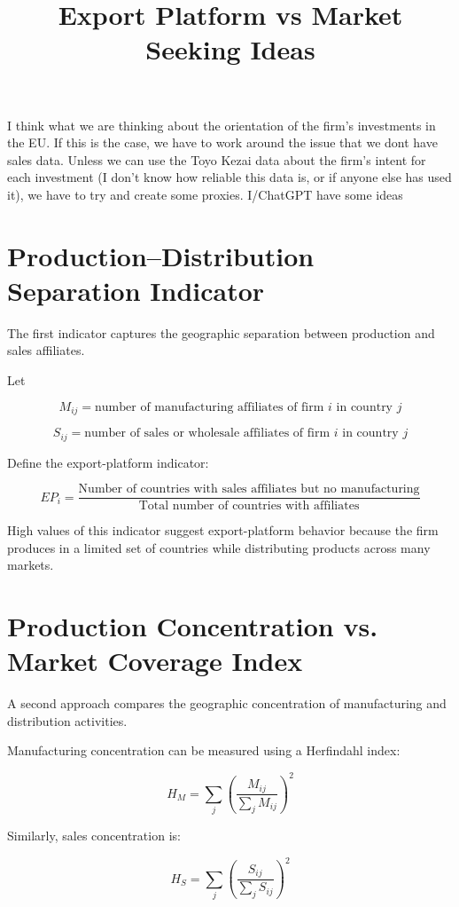 \documentclass[11pt]{article}
\title{Export Platform vs Market Seeking Ideas}
\date{}
\begin{document}
\maketitle

I think what we are thinking about the orientation of the firm's investments in the EU.  If this is the case, we have to work around the issue that we dont have sales data. Unless we can use the Toyo Kezai data about the firm's intent for each investment (I don't know how reliable this data is, or if anyone else has used it), we have to try and create some proxies.  I/ChatGPT have some ideas

\section{Production--Distribution Separation Indicator}

The first indicator captures the geographic separation between production and sales affiliates.

Let

\[
M_{ij} = \text{number of manufacturing affiliates of firm } i \text{ in country } j
\]

\[
S_{ij} = \text{number of sales or wholesale affiliates of firm } i \text{ in country } j
\]

Define the export-platform indicator:

\[
EP_i =
\frac{\text{Number of countries with sales affiliates but no manufacturing}}
{\text{Total number of countries with affiliates}}
\]

High values of this indicator suggest export-platform behavior because the firm produces in a limited set of countries while distributing products across many markets.

\section{Production Concentration vs. Market Coverage Index}

A second approach compares the geographic concentration of manufacturing and distribution activities.

Manufacturing concentration can be measured using a Herfindahl index:

\[
H_M = \sum_j
\left(
\frac{M_{ij}}{\sum_j M_{ij}}
\right)^2
\]

Similarly, sales concentration is:

\[
H_S = \sum_j
\left(
\frac{S_{ij}}{\sum_j S_{ij}}
\right)^2
\]
\end{document}
